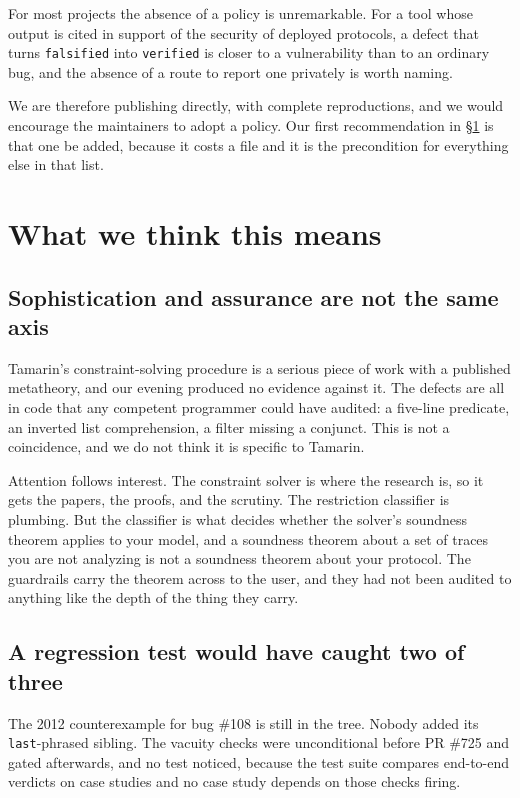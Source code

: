 \documentclass[version=preprint]{iacrcc}
\newcommand{\code}[1]{\texttt{\small #1}}
\theoremstyle{definition}
\theoremstyle{remark}
\begin{document}
For most projects the absence of a policy is unremarkable. For a tool whose
output is cited in support of the security of deployed protocols, a defect that
turns \code{falsified} into \code{verified} is closer to a vulnerability than
to an ordinary bug, and the absence of a route to report one privately is worth
naming.

We are therefore publishing directly, with complete reproductions, and we would
encourage the maintainers to adopt a policy. Our first recommendation in
\S\ref{sec:lessons} is that one be added, because it costs a file and it is the
precondition for everything else in that list.

\section{What we think this means}\label{sec:lessons}

\subsection{Sophistication and assurance are not the same axis}

Tamarin's constraint-solving procedure is a serious piece of work with a
published metatheory, and our evening produced no evidence against it. The
defects are all in code that any competent programmer could have audited: a
five-line predicate, an inverted list comprehension, a filter missing a
conjunct. This is not a coincidence, and we do not think it is specific to
Tamarin.

Attention follows interest. The constraint solver is where the research is, so
it gets the papers, the proofs, and the scrutiny. The restriction classifier is
plumbing. But the classifier is what decides whether the solver's soundness
theorem applies to your model, and a soundness theorem about a set of traces
you are not analyzing is not a soundness theorem about your protocol. The
guardrails carry the theorem across to the user, and they had not been audited
to anything like the depth of the thing they carry.

\subsection{A regression test would have caught two of three}

The 2012 counterexample for bug \#108 is still in the tree. Nobody added its
\code{last}-phrased sibling. The vacuity checks were unconditional before PR
\#725 and gated afterwards, and no test noticed, because the test suite
compares end-to-end verdicts on case studies and no case study depends on those
checks firing.
\end{document}
